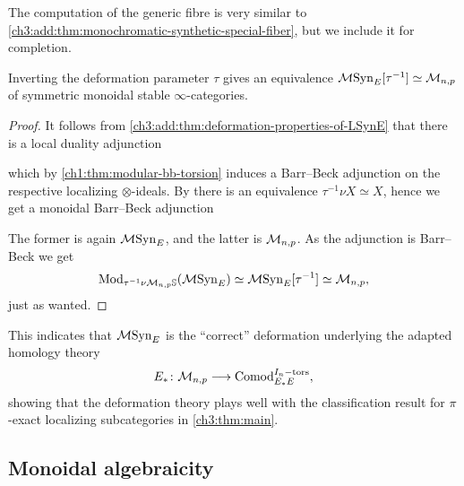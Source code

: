 The computation of the generic fibre is very similar to \cref{ch3:add:thm:monochromatic-synthetic-special-fiber}, but we include it for completion. 

\begin{theorem}
    Inverting the deformation parameter $\tau$ gives an equivalence $\mathcal{M}\mathrm{Syn}_{E}[\tau^{-1}] \simeq \mathcal{M}_{n,p}$ of symmetric monoidal stable $\infty$-categories. 
\end{theorem}
\begin{proof}
    It follows from \cref{ch3:add:thm:deformation-properties-of-LSynE} that there is a local duality adjunction 
    \begin{center}
    \end{center}
    which by \cref{ch1:thm:modular-bb-torsion} induces a Barr--Beck adjunction on the respective localizing $\otimes$-ideals. By \cite[4.40]{pstragowski_2022} there is an equivalence $\tau^{-1}\nu X \simeq X$, hence we get a monoidal Barr--Beck adjunction 
    \begin{center}
    \end{center}
    The former is again $\mathcal{M}\mathrm{Syn}_{E}$, and the latter is $\mathcal{M}_{n,p}$. As the adjunction is Barr--Beck we get 
    \[\mathrm{Mod}_{\tau^{-1}\nu \mathcal{M}_{n,p}\mathbb{S}}(\mathcal{M}\mathrm{Syn}_{E})\simeq \mathcal{M}\mathrm{Syn}_{E}[\tau^{-1}]\simeq \mathcal{M}_{n,p},\]
    just as wanted. 
\end{proof}

This indicates that $\mathcal{M}\mathrm{Syn}_{E}$ is the ``correct'' deformation underlying the adapted homology theory 
\[E_*\colon \mathcal{M}_{n,p} \longrightarrow \mathrm{Comod}_{E_*E}^{I_n-\mathrm{tors}},\] 
showing that the deformation theory plays well with the classification result for $\pi$-exact localizing subcategories in \cref{ch3:thm:main}. 

\subsection{Monoidal algebraicity}

